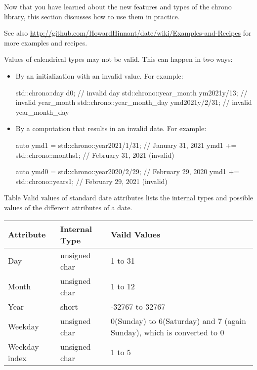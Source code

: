 
Now that you have learned about the new features and types of the chrono library, this section discusses how to use them in practice.

See also \url{http://github.com/HowardHinnant/date/wiki/Examples-and-Recipes} for more examples and recipes.


Values of calendrical types may not be valid. This can happen in two ways:

\begin{itemize}
\item 
By an initialization with an invalid value. For example:

\begin{cpp}
std::chrono::day d{0}; // invalid day
std::chrono::year_month ym{2021y/13}; // invalid year_month
std::chrono::year_month_day ymd{2021y/2/31}; // invalid year_month_day
\end{cpp}

\item 
By a computation that results in an invalid date. For example:

\begin{cpp}
auto ymd1 = std::chrono::year{2021}/1/31; // January 31, 2021
ymd1 += std::chrono::months{1}; // February 31, 2021 (invalid)

auto ymd0 = std::chrono::year{2020}/2/29; // February 29, 2020
ymd1 += std::chrono::years{1}; // February 29, 2021 (invalid)
\end{cpp}
\end{itemize}

Table Valid values of standard date attributes lists the internal types and possible values of the different attributes of a date.

\begin{longtable}[c]{|l|l|l|}
\hline
\textbf{Attribute} & \textbf{Internal Type} & \textbf{Vaild Values}                                                  \\ \hline
\endfirsthead
%
\endhead
%
Day           & unsigned char & 1 to 31         \\ \hline
Month         & unsigned char & 1 to 12         \\ \hline
Year          & short         & -32767 to 32767 \\ \hline
Weekday            & unsigned char          & 0(Sunday) to 6(Saturday) and 7 (again Sunday), which is converted to 0 \\ \hline
Weekday index & unsigned char & 1 to 5          \\ \hline
\end{longtable}

